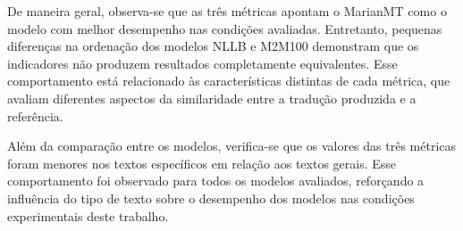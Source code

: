 De maneira geral, observa-se que as três métricas apontam o MarianMT como o modelo com melhor desempenho nas condições avaliadas. Entretanto, pequenas diferenças na ordenação dos modelos NLLB e M2M100 demonstram que os indicadores não produzem resultados completamente equivalentes. Esse comportamento está relacionado às características distintas de cada métrica, que avaliam diferentes aspectos da similaridade entre a tradução produzida e a referência.

Além da comparação entre os modelos, verifica-se que os valores das três métricas foram menores nos textos específicos em relação aos textos gerais. Esse comportamento foi observado para todos os modelos avaliados, reforçando a influência do tipo de texto sobre o desempenho dos modelos nas condições experimentais deste trabalho.